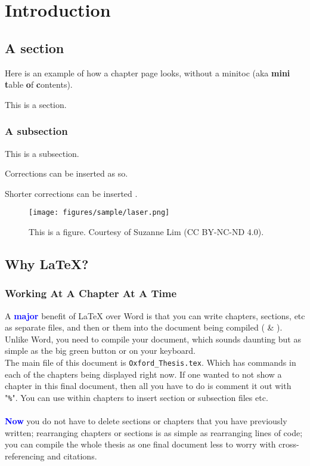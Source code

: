 \chapter{Introduction}
\label{ch: Introduction}

\adjustmtc
\minitoc

\section{A section}
Here is an example of how a chapter page looks, without a minitoc (aka \textbf{mini} \textbf{t}able \textbf{o}f \textbf{c}ontents). 

\noindent This is a section.

\subsection{A subsection}
This is a subsection.

\begin{mccorrection}
Corrections can be inserted as so. 
\end{mccorrection}

Shorter corrections can be inserted . 

\begin{figure}[!ht]
    \centering
    \texttt{[image: figures/sample/laser.png]}
    \caption{This is a figure. Courtesy of Suzanne Lim (CC BY-NC-ND 4.0).}
    \label{fig:laser}
\end{figure}

\section{Why \LaTeX{}?}
\subsection{Working At A Chapter At A Time}
A \textcolor{blue}{\textbf{major}} benefit of \LaTeX{} over Word is that you can write chapters, sections, etc as separate files, and then  or  them into the document being compiled (\verb|| \& \verb||).\\
Unlike Word, you need to compile your document, which sounds daunting but as simple as the big green  button or  on your keyboard.\\
The main file of this document is \verb|Oxford_Thesis.tex|. Which has \verb|| commands in each of the chapters being displayed right now.
If one wanted to not show a chapter in this final document, then all you have to do is comment it out with "\verb|%|".
You can use \verb|| within chapters to insert section or subsection files etc.\\\\
\textcolor{blue}{\textbf{Now}} you do not have to delete sections or chapters that you have previously written; rearranging chapters or sections is as simple as rearranging lines of code; you can compile the whole thesis as one final document less to worry with cross-referencing and citations.

